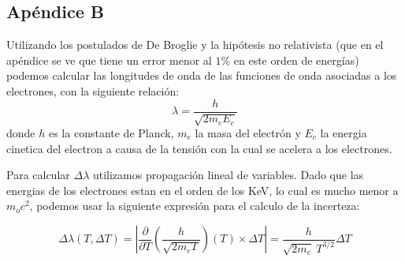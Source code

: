 \documentclass[]{article}
\begin{document}
\hypertarget{apuxe9ndice-b}{%
\subsection{Apéndice B}\label{apuxe9ndice-b}}

Utilizando los postulados de De Broglie y la hipótesis no relativista
(que en el apéndice se ve que tiene un error menor al \(1\%\) en este
orden de energías) podemos calcular las longitudes de onda de las
funciones de onda asociadas a los electrones, con la siguiente relación:
\[\lambda = \frac{h}{\sqrt{2m_e E_c}}\] donde \(h\) es la constante de
Planck, \(m_e\) la masa del electrón y \(E_c\) la energia cinetica del
electron a causa de la tensión con la cual se acelera a los electrones.

Para calcular \(\Delta \lambda\) utilizamos propagación lineal de
variables. Dado que las energias de los electrones estan en el orden de
los KeV, lo cual es mucho menor a \(m_o c^2\), podemos usar la siguiente
expresión para el calculo de la incerteza:

\[\Delta \lambda(T, \Delta T) =
\left |
    \frac{\partial}{\partial T} \left (
        \frac{h}{\sqrt{2m_e T}}
    \right )(T) \times \Delta T
\right | = \frac{h}{\sqrt{2m_e}\ T^{3/2}} \Delta T\]
\end{document}
